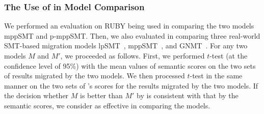 \subsubsection{The Use of {\model} in Model Comparison}
We performed an evaluation on RUBY being used in comparing the two
models mppSMT and p-mppSMT.
%
Then, we also evaluated {\model} in comparing three real-world
SMT-based migration models lpSMT~\cite{fse13}, mppSMT~\cite{ase15},
and GNMT~\cite{gnmt}.  
%
For any two models $M$ and $M'$, we proceeded as follows. First, we
performed $t$-test (at the confidence level of 95\%) with the mean
values of semantic scores on the two sets of results migrated by the
two models. We then processed $t$-test in the same manner on the two
sets of {\model}'s scores for the results migrated by the two
models. If the decision whether $M$ is better than $M'$ by {\model} is
consistent with that by the semantic scores, we consider {\model} as
effective in comparing the models.




